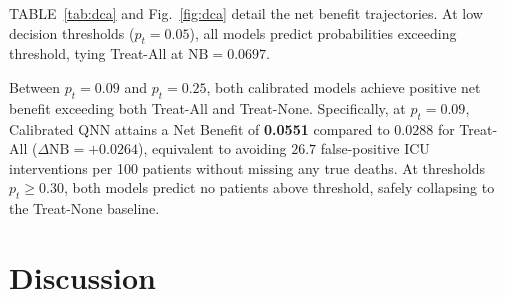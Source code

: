 \documentclass[conference]{IEEEtran}
\begin{document}
TABLE~\ref{tab:dca} and Fig.~\ref{fig:dca} detail the net benefit trajectories. At low decision thresholds ($p_t = 0.05$), all models predict probabilities exceeding threshold, tying Treat-All at $\text{NB} = 0.0697$. 

Between $p_t = 0.09$ and $p_t = 0.25$, both calibrated models achieve positive net benefit exceeding both Treat-All and Treat-None. Specifically, at $p_t = 0.09$, Calibrated QNN attains a Net Benefit of \textbf{0.0551} compared to $0.0288$ for Treat-All ($\Delta\text{NB} = +0.0264$), equivalent to avoiding $26.7$ false-positive ICU interventions per 100 patients without missing any true deaths. At thresholds $p_t \ge 0.30$, both models predict no patients above threshold, safely collapsing to the Treat-None baseline.

\begin{table}[!t]
\centering
\caption{Decision Curve Analysis: Net Benefit Comparison Across Threshold Probabilities $p_t$}
\label{tab:dca}
\end{table}

\section{Discussion}
\end{document}
